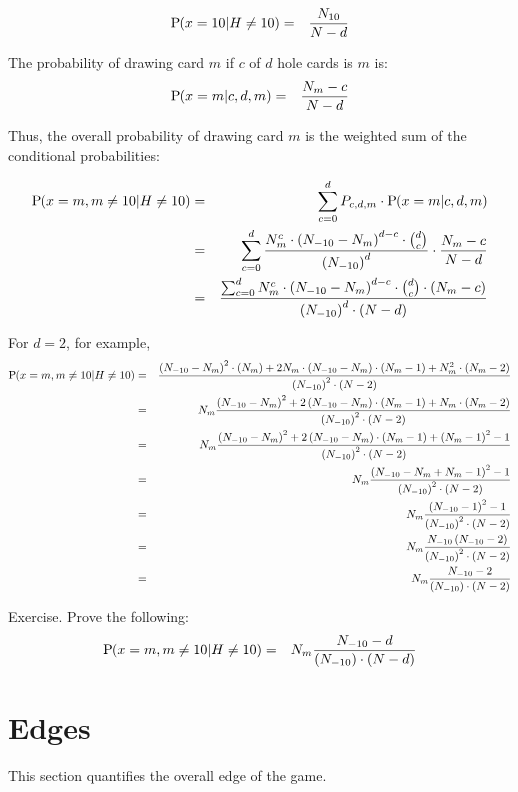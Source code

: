\begin{eqnarray}
\textrm{P}\hspace{-.5ex}\left(x=10|H\neq{}10\right) &=& \frac{N_{10}}{N-d}
\end{eqnarray}

The probability of drawing card $m$ if $c$ of $d$ hole cards is $m$ is:
\begin{eqnarray}
\textrm{P}\hspace{-.5ex}\left(x=m|c,d,m\right) &=& \frac{N_m-c}{N-d}
\end{eqnarray}

Thus, the overall probability of drawing card $m$ is the weighted sum
of the conditional probabilities:

\begin{eqnarray}
\Prob{x=m,m\neq{}10|H\neq{}10} &=&
  \Sum{c=0}{d}{P_{c,d,m}\cdot\Prob{x=m|c,d,m}} \\
&=& \Sum{c=0}{d}{%
\frac{N_m^c\cdot\Paren{N_{-10}-N_m}^{d-c}\cdot\nCr{d}{c}}{\Paren{N_{-10}}^d}%
\cdot\frac{N_m-c}{N-d}} \\
&=& \frac{\Sum{c=0}{d}{N_m^c\cdot\Paren{N_{-10}-N_m}^{d-c}\cdot\nCr{d}{c}\cdot\Paren{N_m-c}}}
{\Paren{N_{-10}}^d\cdot{\Paren{N-d}}}
\end{eqnarray}

For $d=2$, for example, 
\begin{eqnarray}
\textrm{P}\hspace{-.5ex}\left(x=m,m\neq{}10|H\neq{}10\right)
&=& \frac{\left(N_{-10}-N_m\right)^2\cdot\left(N_m\right)
 +2 N_m\cdot\left(N_{-10}-N_m\right)\cdot\left(N_m-1\right)
 +N_m^2\cdot\left(N_m-2\right)
}{\left(N_{-10}\right)^2\cdot{\left(N-2\right)}} \\
&=& N_m \frac{\left(N_{-10}-N_m\right)^2
 + 2\left(N_{-10}-N_m\right)\cdot\left(N_m-1\right)
 +N_m\cdot\left(N_m-2\right)
}{\left(N_{-10}\right)^2\cdot{\left(N-2\right)}} \\
&=& N_m \frac{\left(N_{-10}-N_m\right)^2
 + 2\left(N_{-10}-N_m\right)\cdot\left(N_m-1\right)
 +\left(N_m-1\right)^2 -1
}{\left(N_{-10}\right)^2\cdot{\left(N-2\right)}} \\
&=& N_m \frac{\left(N_{-10}-N_m +N_m -1\right)^2 -1
}{\left(N_{-10}\right)^2\cdot{\left(N-2\right)}} \\
&=& N_m \frac{\left(N_{-10} -1\right)^2 -1
}{\left(N_{-10}\right)^2\cdot{\left(N-2\right)}} \\
&=& N_m \frac{N_{-10}\left(N_{-10} -2\right)
}{\left(N_{-10}\right)^2\cdot{\left(N-2\right)}} \\
&=& N_m \frac{N_{-10} -2}{\left(N_{-10}\right)\cdot{\left(N-2\right)}}
\end{eqnarray}

Exercise.
Prove the following:
\begin{eqnarray}
\textrm{P}\hspace{-.5ex}\left(x=m,m\neq{}10|H\neq{}10\right) &=&
  N_m \frac{N_{-10} -d}{\left(N_{-10}\right)\cdot{\left(N-d\right)}}
\end{eqnarray}

\section{Edges}
\label{sec:basic:edges}

This section quantifies the overall edge of the game.

